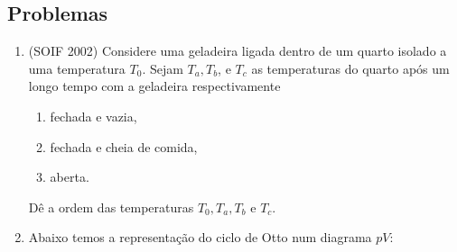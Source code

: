 \subsection{Problemas}

\begin{enumerate}
    \item
        (SOIF 2002) Considere uma geladeira ligada dentro de um quarto isolado a
        uma temperatura $T_0$. Sejam $T_a,T_b$, e $T_c$ as temperaturas do
        quarto após um longo tempo com a geladeira respectivamente
        \begin{enumerate}
            \item
                fechada e vazia,
            \item
                fechada e cheia de comida,
            \item
                aberta.
        \end{enumerate}
        Dê a ordem das temperaturas $T_0,T_a,T_b$ e $T_c$.

    \item
        Abaixo temos a representação do ciclo de Otto num diagrama $pV$:
        \begin{figure}[H]
            \centering
\end{figure}
\end{enumerate}

